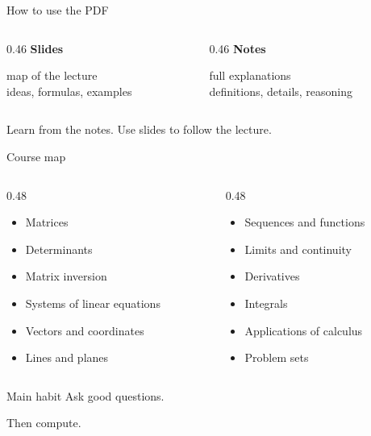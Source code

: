 \documentclass[aspectratio=169,11pt]{beamer}
\newcommand{\keyword}[1]{\textbf{#1}}
\begin{document}
\begin{frame}{How to use the PDF}
  \Large
  \begin{columns}[T]
    \begin{column}{0.46\textwidth}
      \centering
      \keyword{Slides}

      \vspace{0.4cm}
      map of the lecture\\
      ideas, formulas, examples
    \end{column}

    \begin{column}{0.46\textwidth}
      \centering
      \keyword{Notes}

      \vspace{0.4cm}
      full explanations\\
      definitions, details, reasoning
    \end{column}
  \end{columns}

  \vspace{0.9cm}
  \centering
  \Large
  Learn from the notes. Use slides to follow the lecture.
\end{frame}

\begin{frame}{Course map}
  \small
  \begin{columns}[T]
    \begin{column}{0.48\textwidth}
      \begin{itemize}
        \item Matrices
        \item Determinants
        \item Matrix inversion
        \item Systems of linear equations
        \item Vectors and coordinates
        \item Lines and planes
      \end{itemize}
    \end{column}
    \begin{column}{0.48\textwidth}
      \begin{itemize}
        \item Sequences and functions
        \item Limits and continuity
        \item Derivatives
        \item Integrals
        \item Applications of calculus
        \item Problem sets
      \end{itemize}
    \end{column}
  \end{columns}
\end{frame}

\begin{frame}{Main habit}
  \centering
  \Huge
  Ask good questions.

  \vspace{0.8cm}
  \Large
  Then compute.
\end{frame}
\end{document}
